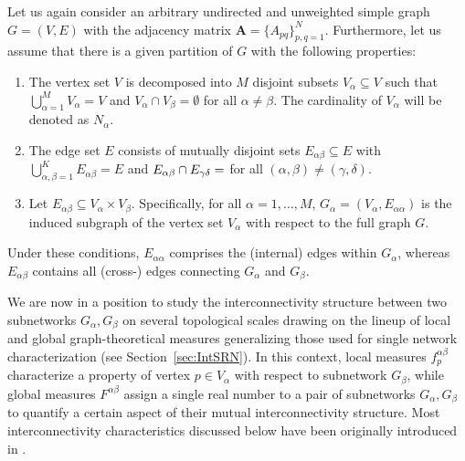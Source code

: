 			Let us again consider an arbitrary undirected and unweighted simple graph $G=(V,E)$ with the adjacency matrix $\textbf{A}=\{A_{pq}\}_{p,q=1}^N$. Furthermore, let us assume that there is a given partition of $G$ with the following properties:
\begin{enumerate}
\item The vertex set $V$ is decomposed into $M$ disjoint subsets $V_\alpha \subseteq V$ such that $\bigcup_{\alpha=1}^M V_\alpha = V$ and $V_\alpha \cap V_\beta = \emptyset$ for all $\alpha \neq \beta$. The cardinality of $V_\alpha$ will be denoted as $N_\alpha$. 

\item The edge set $E$ consists of mutually disjoint sets $E_{\alpha\beta} \subseteq E$ with $\bigcup_{\alpha,\beta=1}^K E_{\alpha\beta} = E$ and $E_{\alpha\beta} \cap E_{\gamma\delta}=\empty$ for all $(\alpha,\beta) \neq (\gamma,\delta)$.

\item Let $E_{\alpha\beta}\subseteq V_\alpha \times V_\beta$. Specifically, for all $\alpha=1,\dots,M$, $G_\alpha=(V_\alpha,E_{\alpha\alpha})$ is the induced subgraph of the vertex set $V_\alpha$ with respect to the full graph $G$.
\end{enumerate}
Under these conditions, $E_{\alpha\alpha}$ comprises the (internal) edges within $G_\alpha$, whereas $E_{\alpha\beta}$ contains all (cross-) edges connecting $G_\alpha$ and $G_\beta$. 

			We are now in a position to study the interconnectivity structure between two subnetworks $G_\alpha, G_\beta$ on several topological scales drawing on the lineup of local and global graph-theoretical measures generalizing those used for single network characterization (see Section~\ref{sec:IntSRN}). In this context, local measures ${f}_p^{\alpha\beta}$ characterize a property of vertex $p \in V_\alpha$ with respect to subnetwork $G_\beta$, while global measures ${F}^{\alpha\beta}$ assign a single real number to a pair of subnetworks $G_\alpha, G_\beta$ to quantify a certain aspect of their mutual interconnectivity structure. Most interconnectivity characteristics discussed below have been originally introduced in \cite{Donges2011b}.

